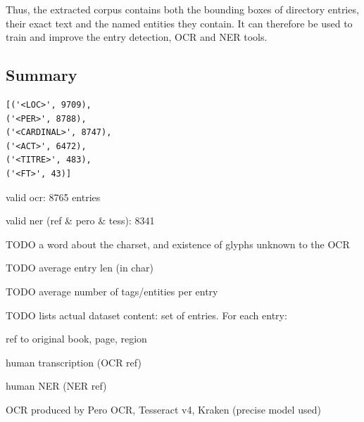 Thus, the extracted corpus contains both the bounding boxes of directory entries, their exact text and the named entities they contain. It can therefore be used to train and improve the entry detection, OCR and NER tools.

\subsection{Summary}

\begin{verbatim}
[('<LOC>', 9709),
('<PER>', 8788),
('<CARDINAL>', 8747),
('<ACT>', 6472),
('<TITRE>', 483),
('<FT>', 43)]
\end{verbatim}
 
 valid ocr: 8765 entries
 
 valid ner (ref \& pero \& tess): 8341


TODO a word about the charset, and existence of glyphs unknown to the OCR

TODO average entry len (in char)

TODO average number of tags/entities per entry

TODO lists actual dataset content: set of entries. For each entry:
\begin{itemize*}
    \item ref to original book, page, region
    \item human transcription (OCR ref)
    \item human NER (NER ref)
    \item OCR produced by Pero OCR, Tesseract v4, Kraken (precise model used)
\end{itemize*}
